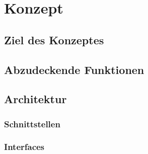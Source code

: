 \chapter{Konzept}
\label{chap:konzept}
\section{Ziel des Konzeptes}
\section{Abzudeckende Funktionen}
\section{Architektur}
\subsection{Schnittstellen}

\subsection{Interfaces}
